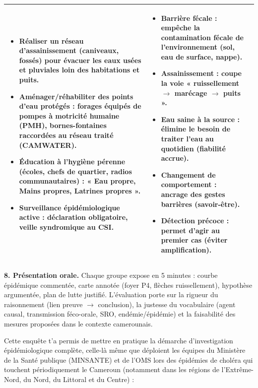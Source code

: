 \documentclass[11pt]{article}
\newcommand{\cle}[1]{{\popxbold\color{popdark}#1}}
\newcounter{popsec}
\newcounter{popsub}
\newcommand{\courssub}[1]{%
  \stepcounter{popsub}%
  \par\vspace{9pt}\noindent{\popxbold\fontsize{11.5}{13}\selectfont\color{popink}{\color{poporange}\thepopsec.\thepopsub}\hspace{6pt}#1}\par\nopagebreak\vspace{4pt}
}
\begin{document}
\begin{exoresolu}
\begin{center}
\begin{tabularx}{\linewidth}{|l|X|X|}
\begin{itemize}
\item Réaliser un réseau d'assainissement (caniveaux, fossés) pour évacuer les eaux usées et pluviales loin des habitations et puits.
\item Aménager/réhabiliter des points d'eau protégés : forages équipés de pompes à motricité humaine (PMH), bornes-fontaines raccordées au réseau traité (CAMWATER).
\item Éducation à l'hygiène pérenne (écoles, chefs de quartier, radios communautaires) : « Eau propre, Mains propres, Latrines propres ».
\item Surveillance épidémiologique active : déclaration obligatoire, veille syndromique au CSI.
\end{itemize} &
\begin{itemize}
\item \textbf{Barrière fécale} : empêche la contamination fécale de l'environnement (sol, eau de surface, nappe).
\item \textbf{Assainissement} : coupe la voie « ruissellement $\rightarrow$ marécage $\rightarrow$ puits ».
\item \textbf{Eau saine à la source} : élimine le besoin de traiter l'eau au quotidien (fiabilité accrue).
\item \textbf{Changement de comportement} : ancrage des gestes barrières (savoir-être).
\item \textbf{Détection précoce} : permet d'agir au premier cas (éviter amplification).
\end{itemize} \\ \hline
\end{tabularx}
\end{center}

\textbf{8. Présentation orale.}
Chaque groupe expose en 5 minutes : courbe épidémique commentée, carte annotée (foyer P4, flèches ruissellement), hypothèse argumentée, plan de lutte justifié. L'évaluation porte sur la rigueur du raisonnement (lien preuve $\rightarrow$ conclusion), la justesse du vocabulaire (agent causal, transmission féco-orale, SRO, endémie/épidémie) et la faisabilité des mesures proposées dans le contexte camerounais.

\end{exoresolu}

\courssub{Bilan de l'activité}

Cette enquête t'a permis de mettre en pratique la \cle{démarche d'investigation épidémiologique} complète, celle-là même que déploient les équipes du Ministère de la Santé publique (MINSANTE) et de l'OMS lors des épidémies de choléra qui touchent périodiquement le Cameroun (notamment dans les régions de l'Extrême-Nord, du Nord, du Littoral et du Centre) :
\end{document}
